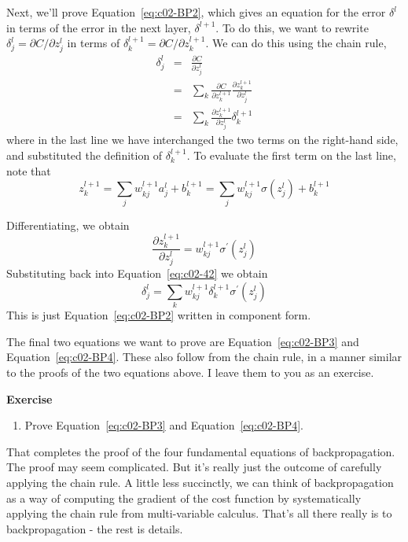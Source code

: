 Next, we'll prove Equation~\ref{eq:c02-BP2}, which gives an equation for the error $\delta^{l}$
in terms of the error in the next layer, $\delta^{l+1}$. To do this, we want to rewrite $\delta_{j}^{l}=\partial C / \partial z_{j}^{l}$ in terms of $\delta_{k}^{l+1}=\partial C / \partial z_{k}^{l+1}$. We can do this using the chain rule, 
\begin{eqnarray}
\delta_{j}^{l} &=&\frac{\partial C}{\partial z_{j}^{l}} \label{eq:c02-40}\\ 
&=&\sum_{k} \frac{\partial C}{\partial z_{k}^{l+1}} \frac{\partial z_{k}^{l+1}}{\partial z_{j}^{l}} \label{eq:c02-41}\\ 
&=&\sum_{k} \frac{\partial z_{k}^{l+1}}{\partial z_{j}^{l}} \delta_{k}^{l+1} \label{eq:c02-42}
\end{eqnarray}
where in the last line we have interchanged the two terms on the right-hand side, and substituted the definition of $\delta_{k}^{l+1}$. To evaluate the first term on the last line, note that 
\begin{equation}
z_{k}^{l+1}=\sum_{j} w_{k j}^{l+1} a_{j}^{l}+b_{k}^{l+1}=\sum_{j} w_{k j}^{l+1} \sigma\left(z_{j}^{l}\right)+b_{k}^{l+1}
\label{eq:c02-43}
\end{equation}


Differentiating, we obtain 
\begin{equation}
\frac{\partial z_{k}^{l+1}}{\partial z_{j}^{l}}=w_{k j}^{l+1} \sigma^{\prime}\left(z_{j}^{l}\right)
\label{eq:c02-44}
\end{equation}
Substituting back into Equation~\ref{eq:c02-42} we obtain 
\begin{equation}
\delta_{j}^{l}=\sum_{k} w_{k j}^{l+1} \delta_{k}^{l+1} \sigma^{\prime}\left(z_{j}^{l}\right)
\label{eq:c02-45}
\end{equation}
This is just Equation~\ref{eq:c02-BP2} written in component form.

The final two equations we want to prove are Equation~\ref{eq:c02-BP3} and Equation~\ref{eq:c02-BP4}. These also follow from the chain rule, in a manner similar to the proofs of the two equations above. I leave them to you as an exercise. 

\textbf{Exercise}
\begin{enumerate}
\item 
Prove Equation~\ref{eq:c02-BP3} and Equation~\ref{eq:c02-BP4}. 
\end{enumerate}

That completes the proof of the four fundamental equations of backpropagation. The proof may seem complicated. But it's really just the outcome of carefully applying the chain rule. A little less succinctly, we can think of backpropagation as a way of computing the gradient of the cost function by systematically applying the chain rule from multi-variable calculus. That's all there really is to backpropagation - the rest is details.

